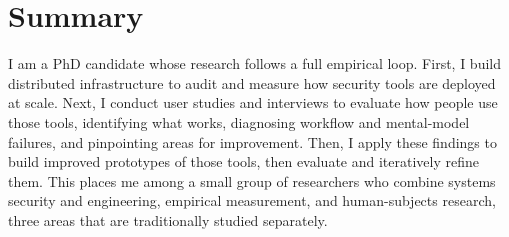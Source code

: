 
\section{Summary}

I am a PhD candidate whose research follows a full empirical loop. First, I build distributed infrastructure to audit and measure how security tools are deployed at scale. Next, I conduct user studies and interviews to evaluate how people use those tools, identifying what works, diagnosing workflow and mental-model failures, and pinpointing areas for improvement. Then, I apply these findings to build improved prototypes of those tools, then evaluate and iteratively refine them. This places me among a small group of researchers who combine systems security and engineering, empirical measurement, and human-subjects research, three areas that are traditionally studied separately.